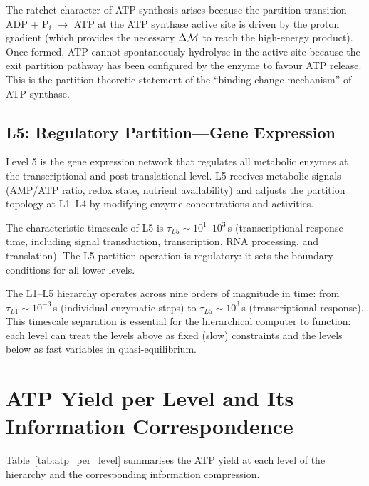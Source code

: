 The ratchet character of ATP synthesis arises because the partition transition
ADP + P$_i$ $\to$ ATP at the ATP synthase active site is driven by the
proton gradient (which provides the necessary $\Delta\mathcal{M}$ to reach the
high-energy product). Once formed, ATP cannot spontaneously hydrolyse in the
active site because the exit partition pathway has been configured by the
enzyme to favour ATP release. This is the partition-theoretic statement of
the ``binding change mechanism'' of ATP synthase.

\subsection{L5: Regulatory Partition---Gene Expression}
\label{ssec:L5}

Level 5 is the gene expression network that regulates all metabolic enzymes
at the transcriptional and post-translational level. L5 receives metabolic
signals (AMP/ATP ratio, redox state, nutrient availability) and adjusts the
partition topology at L1--L4 by modifying enzyme concentrations and activities.

The characteristic timescale of L5 is $\tau_{L5} \sim 10^1$--$10^3$\,s
(transcriptional response time, including signal transduction, transcription,
RNA processing, and translation). The L5 partition operation is regulatory:
it sets the boundary conditions for all lower levels.

\begin{remark}
The L1--L5 hierarchy operates across nine orders of magnitude in time:
from $\tau_{L1} \sim 10^{-3}$\,s (individual enzymatic steps) to
$\tau_{L5} \sim 10^3$\,s (transcriptional response). This timescale
separation is essential for the hierarchical computer to function: each
level can treat the levels above as fixed (slow) constraints and the
levels below as fast variables in quasi-equilibrium.
\end{remark}

\section{ATP Yield per Level and Its Information Correspondence}
\label{sec:atp_yield}

Table~\ref{tab:atp_per_level} summarises the ATP yield at each level of the
hierarchy and the corresponding information compression.

